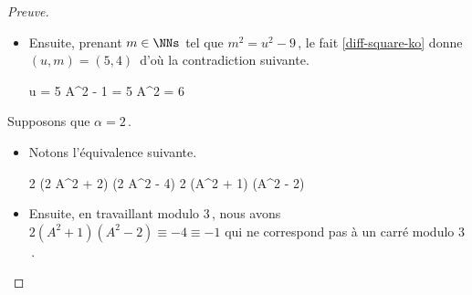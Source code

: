 \begin{proof}[Preuve]
\begin{itemize}
		\item Ensuite, prenant $m \in \NNs$ tel que $m^2 = u^2 - 9$\,, le fait \ref{diff-square-ko} donne $(u, m) = (5, 4)$\, d'où la contradiction suivante.
        
        \noindent\kern-6pt%
        \begin{stepcalc}[style=sar, ope=\iff]
        	u = 5
    	\explnext{}
        	A^2 - 1 = 5
        	A^2 = 6
        \end{stepcalc}
    \end{itemize}
    
    \medskip
    
	Supposons que $\alpha = 2$\,.
    \begin{itemize}
    	\item Notons l'équivalence suivante.
        
        \noindent\kern-6pt%
        \begin{stepcalc}[style=ar*, ope=\iff]
        	2 (2 A^2 + 2) (2 A^2 - 4) \in \NNssquare
        	2 (A^2 + 1) (A^2 - 2) \in \NNssquare
        \end{stepcalc}

		\item Ensuite, en travaillant modulo $3$\,, nous avons
		$2 (A^2 + 1) (A^2 - 2) \equiv -4 \equiv -1$ qui ne correspond pas à un carré modulo $3$\,.
		\qedhere 
    \end{itemize}   
\end{proof}

